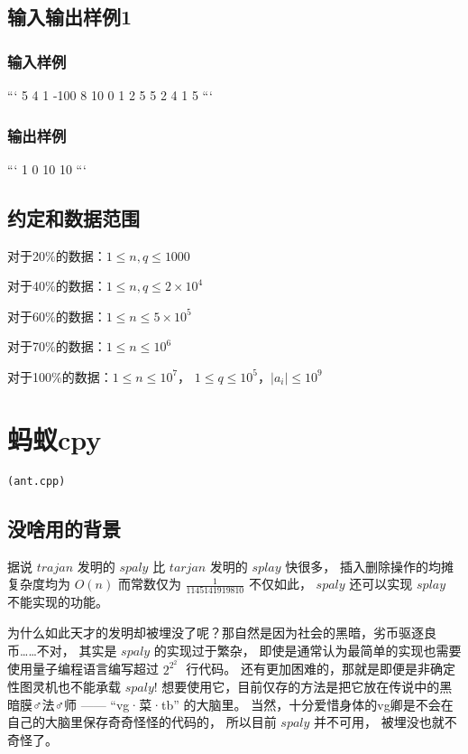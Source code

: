 \documentclass[UTF8]{ctexart}
\begin{document}
\subsection{输入输出样例1}

\subsubsection{输入样例}

```
5 4
1 -100 8 10 0
1 2
5 5
2 4
1 5
```

\subsubsection{输出样例}

```
1
0
10
10
```

\subsection{约定和数据范围}

对于20\%的数据：$1\le n,q \le 1000$

对于40\%的数据：$1\le n,q \le 2\times 10^4$

对于60\%的数据：$1\le n \le 5\times 10^5$

对于70\%的数据：$1\le n \le 10^6$

对于100\%的数据：$1 \le n \le 10^7$， $1\le q\le 10^5$，$|a_i| \le 10^9$

\newpage
\section{蚂蚁cpy}
\begin{center}
\tt\large{(ant.cpp)}
\end{center}

\subsection{没啥用的背景}

据说 $trajan$ 发明的 $spaly$ 比 $tarjan$ 发明的 $splay$ 快很多， 插入删除操作的均摊复杂度均为 $O(n)$ 而常数仅为 $\frac{1}{1145141919810}$ 不仅如此， $spaly$ 还可以实现 $splay$ 不能实现的功能。

为什么如此天才的发明却被埋没了呢？那自然是因为社会的黑暗，劣币驱逐良币……不对， 其实是 $spaly$ 的实现过于繁杂， 即使是通常认为最简单的实现也需要使用量子编程语言编写超过 $2^{2^{2^{\cdots}}}$ 行代码。 还有更加困难的，那就是即便是非确定性图灵机也不能承载 $spaly$! 想要使用它，目前仅存的方法是把它放在传说中的黑暗膜♂法♂师 —— “vg·菜·tb” 的大脑里。 当然，十分爱惜身体的vg卿是不会在自己的大脑里保存奇奇怪怪的代码的， 所以目前 $spaly$ 并不可用， 被埋没也就不奇怪了。
\end{document}
